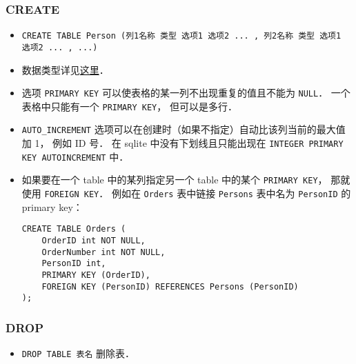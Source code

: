 \subsubsection{CREATE}
\begin{itemize}
\item \verb|CREATE TABLE Person (列1名称 类型 选项1 选项2 ... , 列2名称 类型 选项1 选项2 ... , ...)|
\item 数据类型详见\href{https://www.w3schools.com/sql/sql_datatypes.asp}{这里}．
\item 选项 \verb|PRIMARY KEY| 可以使表格的某一列不出现重复的值且不能为 \verb|NULL|． 一个表格中只能有一个 \verb|PRIMARY KEY|， 但可以是多行．
\item \verb|AUTO_INCREMENT| 选项可以在创建时（如果不指定）自动比该列当前的最大值加 1， 例如 ID 号． 在 sqlite 中没有下划线且只能出现在 \verb|INTEGER PRIMARY KEY AUTOINCREMENT| 中．
\item 如果要在一个 table 中的某列指定另一个 table 中的某个 \verb|PRIMARY KEY|， 那就使用 \verb|FOREIGN KEY|． 例如在 \verb|Orders| 表中链接 \verb|Persons| 表中名为 \verb|PersonID| 的 primary key：
\begin{lstlisting}[language=none]
CREATE TABLE Orders (
    OrderID int NOT NULL,
    OrderNumber int NOT NULL,
    PersonID int,
    PRIMARY KEY (OrderID),
    FOREIGN KEY (PersonID) REFERENCES Persons (PersonID)
);
\end{lstlisting}
\end{itemize}

\subsubsection{DROP}
\begin{itemize}
\item \verb|DROP TABLE 表名| 删除表．
\end{itemize}


